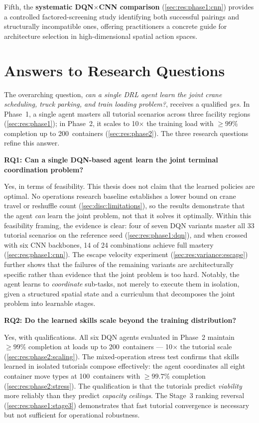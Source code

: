 Fifth, the \textbf{systematic DQN$\times$CNN comparison} (\cref{sec:res:phase1:cnn}) provides a controlled factored-screening study identifying both successful pairings and structurally incompatible ones, offering practitioners a concrete guide for architecture selection in high-dimensional spatial action spaces.

\section{Answers to Research Questions}
\label{sec:concl:rqs}

The overarching question, \emph{can a single DRL agent learn the joint crane scheduling, truck parking, and train loading problem?}, receives a qualified \emph{yes}. In Phase~1, a single agent masters all tutorial scenarios across three facility regions (\cref{sec:res:phase1}); in Phase~2, it scales to 10$\times$ the training load with $\geq 99\%$ completion up to 200~containers (\cref{sec:res:phase2}). The three research questions refine this answer.

\textbf{RQ1: Can a single DQN-based agent learn the joint terminal coordination problem?}

Yes, in terms of feasibility. This thesis does not claim that the learned policies are optimal. No operations research baseline establishes a lower bound on crane travel or reshuffle count (\cref{sec:disc:limitations}), so the results demonstrate that the agent \emph{can} learn the joint problem, not that it solves it optimally. Within this feasibility framing, the evidence is clear: four of seven DQN variants master all 33 tutorial scenarios on the reference seed (\cref{sec:res:phase1:dqn}), and when crossed with six CNN backbones, 14 of 24 combinations achieve full mastery (\cref{sec:res:phase1:cnn}). The escape velocity experiment (\cref{sec:res:variance:escape}) further shows that the failures of the remaining variants are architecturally specific rather than evidence that the joint problem is too hard. Notably, the agent learns to \emph{coordinate} sub-tasks, not merely to execute them in isolation, given a structured spatial state and a curriculum that decomposes the joint problem into learnable stages.

\textbf{RQ2: Do the learned skills scale beyond the training distribution?}

Yes, with qualifications. All six DQN agents evaluated in Phase~2 maintain $\geq 99\%$ completion at loads up to 200~containers --- 10$\times$ the tutorial scale (\cref{sec:res:phase2:scaling}). The mixed-operation stress test confirms that skills learned in isolated tutorials compose effectively: the agent coordinates all eight container move types at 100~containers with $\geq 99.7\%$ completion (\cref{sec:res:phase2:stress}). The qualification is that the tutorials predict \emph{viability} more reliably than they predict \emph{capacity ceilings}. The Stage~3 ranking reversal (\cref{sec:res:phase1:stage3}) demonstrates that fast tutorial convergence is necessary but not sufficient for operational robustness.

